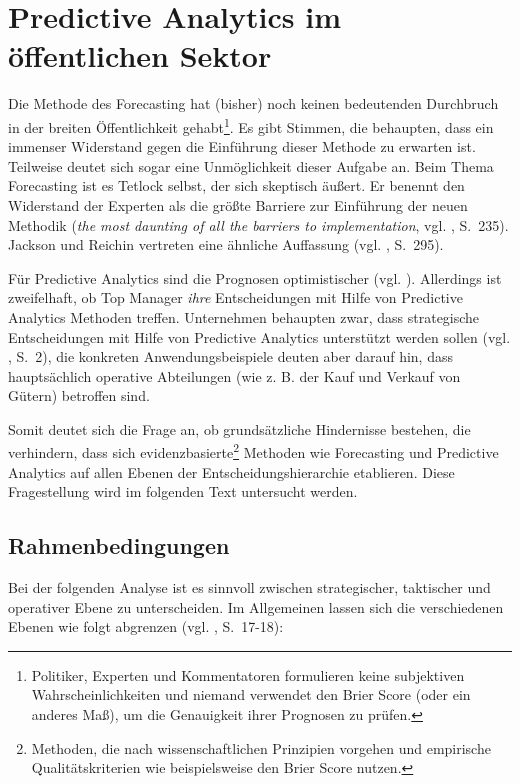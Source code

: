 \chapter{Predictive Analytics im öffentlichen Sektor}

Die Methode des Forecasting hat (bisher) noch keinen bedeutenden Durchbruch in
der breiten Öffentlichkeit gehabt\footnote{
Politiker, Experten und Kommentatoren formulieren keine subjektiven Wahrscheinlichkeiten und
niemand verwendet den Brier Score (oder ein anderes Maß), um die Genauigkeit ihrer Prognosen
zu prüfen. 
}. Es gibt Stimmen, die behaupten, dass ein immenser Widerstand gegen die
Einführung dieser Methode zu erwarten ist. Teilweise deutet sich sogar eine
Unmöglichkeit dieser Aufgabe an. 
Beim Thema Forecasting ist es Tetlock selbst, der sich skeptisch äußert. Er
benennt den Widerstand der Experten als die größte Barriere zur Einführung der
neuen Methodik (\emph{the most daunting of all the barriers to implementation},
vgl. \cite{Tetlock}, S.~235). Jackson und Reichin vertreten eine ähnliche
Auffassung (vgl. \cite{Jackson}, S.~295). 

Für Predictive Analytics sind die Prognosen optimistischer (vgl. \cite{Mauerer}).
Allerdings ist zweifelhaft, ob Top Manager \emph{ihre} Entscheidungen mit Hilfe
von Predictive Analytics Methoden treffen.
Unternehmen behaupten zwar, dass strategische Entscheidungen mit Hilfe von Predictive Analytics
unterstützt werden sollen (vgl. \cite{Mauerer}, S.~2), die konkreten Anwendungsbeispiele deuten
aber darauf hin, dass hauptsächlich operative Abteilungen (wie z. B. der Kauf und Verkauf von
Gütern) betroffen sind.

Somit deutet sich die Frage an, ob grundsätzliche Hindernisse bestehen, die verhindern, dass sich
evidenzbasierte\footnote{
Methoden, die nach wissenschaftlichen Prinzipien vorgehen und empirische Qualitätskriterien wie
beispielsweise den Brier Score nutzen.
} Methoden wie Forecasting und Predictive Analytics auf allen Ebenen der
Entscheidungshierarchie etablieren. Diese Fragestellung wird im folgenden Text untersucht werden.

\section{Rahmenbedingungen}

Bei der folgenden Analyse ist es sinnvoll zwischen strategischer, taktischer und
operativer Ebene zu unterscheiden. Im Allgemeinen lassen sich die verschiedenen
Ebenen wie folgt abgrenzen (vgl. \cite{Gluchowski}, S.~17-18):

